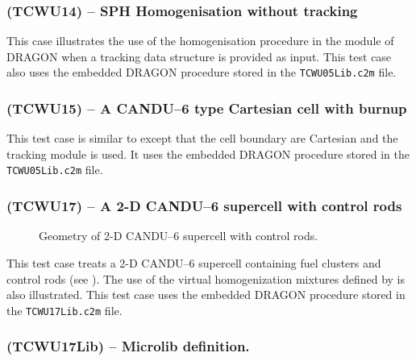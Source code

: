 
\subsubsection{\tst(TCWU14) -- SPH Homogenisation without tracking}\label{sect:ExTCWU14}

This case illustrates the use of the  homogenisation procedure in the  module of DRAGON when a tracking data
structure is provided as input. This test case also uses the embedded DRAGON procedure stored in the {\tt TCWU05Lib.c2m} file.


\subsubsection{\tst(TCWU15) -- A CANDU--6 type Cartesian cell with burnup}\label{sect:ExTCWU15}

This test case is similar to  except that the cell boundary are Cartesian and the  tracking module is used. It uses the embedded DRAGON procedure stored in the {\tt TCWU05Lib.c2m} file.


\subsubsection{\tst(TCWU17) -- A 2-D CANDU--6 supercell with control rods}\label{sect:ExTCWU17}

\begin{figure}[h!]  
\begin{center} 
\parbox{15.0cm}{\epsfxsize=15cm }
\parbox{14cm}{\caption{Geometry of 2-D CANDU--6 supercell with control rods.}\label{fig:TCWU17}}   
\end{center}  
\end{figure}

This test case treats a 2-D CANDU--6 supercell containing fuel clusters and control rods (see ). The use of the virtual homogenization mixtures defined by  is also illustrated. This test case uses the embedded DRAGON procedure
stored in the {\tt TCWU17Lib.c2m} file.
 

\subsubsection{\tst(TCWU17Lib) -- Microlib definition.}\label{sect:TCWU17Lib}

